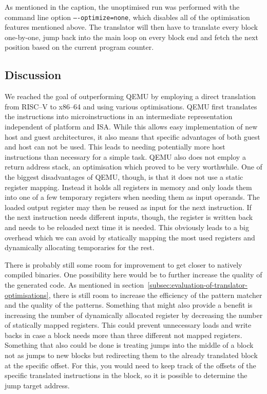 As mentioned in the caption, the unoptimised run was performed with the command line option \texttt{----optimize=none}, which disables all of the optimisation features mentioned above.
The translator will then have to translate every block one-by-one, jump back into the main loop on every block end and fetch the next position based on the current program counter.


\subsection{Discussion}
We reached the goal of outperforming QEMU by employing a direct translation from RISC--V to x86--64 and using various optimisations.
QEMU first translates the instructions into microinstructions in an intermediate representation independent of platform and ISA.
While this allows easy implementation of new host and guest architectures, it also means that specific advantages of both guest and host can not be used.
This leads to needing potentially more host instructions than necessary for a simple task.
QEMU also does not employ a return address stack, an optimisation which proved to be very worthwhile.
One of the biggest disadvantages of QEMU, though, is that it does not use a static register mapping.
Instead it holds all registers in memory and only loads them into one of a few temporary registers when needing them as input operands.
The loaded output register may then be reused as input for the next instruction.
If the next instruction needs different inputs, though, the register is written back and needs to be reloaded next time it is needed.
This obviously leads to a big overhead which we can avoid by statically mapping the most used registers and dynamically allocating temporaries for the rest.

There is probably still some room for improvement to get closer to natively compiled binaries.
One possibility here would be to further increase the quality of the generated code.
As mentioned in section~\vref{subsec:evaluation-of-translator-optimisations}, there is still room to increase the efficiency of the pattern matcher and the quality of the patterns.
Something that might also provide a benefit is increasing the number of dynamically allocated register by decreasing the number of statically mapped registers.
This could prevent unnecessary loads and write backs in case a block needs more than three different not mapped registers.
Something that also could be done is treating jumps into the middle of a block not as jumps to new blocks but redirecting them to the already translated block at the specific offset.
For this, you would need to keep track of the offsets of the specific translated instructions in the block, so it is possible to determine the jump target address.

